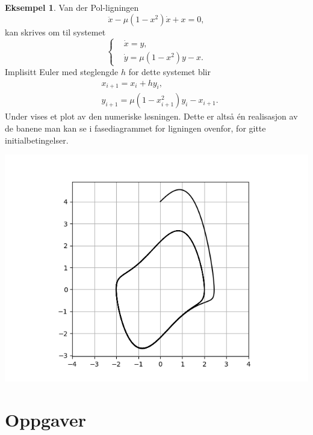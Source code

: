 \documentclass{article}
\theoremstyle{plain}
\theoremstyle{definition}
\newtheorem{eksempel}[teorem]{Eksempel}
\theoremstyle{remark}
\begin{document}
\begin{eksempel}
    Van der Pol-ligningen
    \begin{equation*}
        \ddot{x} - \mu (1 - x^2) \dot{x} + x = 0,
    \end{equation*}
    kan skrives om til systemet
    \begin{equation*}
        \left\{
            \begin{aligned}
                & \dot{x} = y, \\
                & \dot{y} = \mu(1-x^2)y - x.
            \end{aligned}
        \right.
    \end{equation*}
    Implisitt Euler med steglengde $h$ for dette systemet blir
    \begin{equation*}
        \begin{aligned}
            & x_{i+1} = x_i + h y_i, \\
            & y_{i+1} = \mu(1-x_{i+1}^2)y_i - x_{i+1}.
        \end{aligned}
    \end{equation*}
    Under vises et plot av den numeriske løsningen. Dette er altså én realisasjon av de banene man kan se i fasediagrammet for ligningen ovenfor, for gitte initialbetingelser.
    \begin{center}
        \includegraphics[scale=0.5]{van_der_pol_impl_euler.png}
    \end{center}
\end{eksempel}


\section*{Oppgaver}
\end{document}
